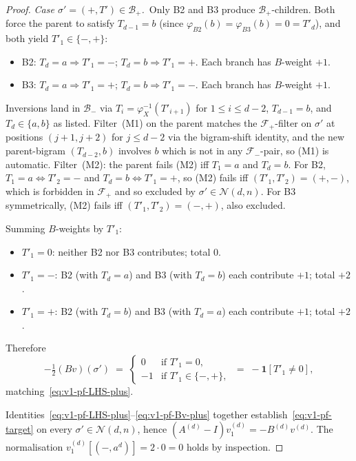 \documentclass{amsart}
\theoremstyle{definition}
\theoremstyle{remark}
\begin{document}
\begin{proof}
\emph{Case $\sigma' = (+, T') \in \mathcal{B}_+$.}\ Only B2 and
B3 produce $\mathcal{B}_+$-children.  Both force the parent to
satisfy $T_{d-1} = b$ (since $\varphi_{B2}(b) = \varphi_{B3}(b) =
0 = T'_d$), and both yield $T'_1 \in \{-, +\}$:
\begin{itemize}
\item B2: $T_d = a \Rightarrow T'_1 = -$; $T_d = b \Rightarrow
  T'_1 = +$.  Each branch has $B$-weight $+1$.
\item B3: $T_d = a \Rightarrow T'_1 = +$; $T_d = b \Rightarrow
  T'_1 = -$.  Each branch has $B$-weight $+1$.
\end{itemize}
Inversions land in $\mathcal{B}_-$ via $T_i = \varphi_X^{-1}
(T'_{i+1})$ for $1 \le i \le d-2$, $T_{d-1} = b$, and $T_d \in
\{a, b\}$ as listed.  Filter~(M1) on the parent matches the
$\mathcal{F}_+$-filter on $\sigma'$ at positions $(j+1, j+2)$ for
$j \le d-2$ via the bigram-shift identity, and the new
parent-bigram $(T_{d-2}, b)$ involves $b$ which is not in any
$\mathcal{F}_-$-pair, so (M1) is automatic.  Filter~(M2): the
parent fails (M2) iff $T_1 = a$ and $T_d = b$.  For B2,
$T_1 = a \Leftrightarrow T'_2 = -$ and $T_d = b \Leftrightarrow
T'_1 = +$, so (M2) fails iff $(T'_1, T'_2) = (+, -)$, which is
forbidden in $\mathcal{F}_+$ and so excluded by $\sigma' \in
\mathcal{N}(d, n)$.  For B3 symmetrically, (M2) fails iff
$(T'_1, T'_2) = (-, +)$, also excluded.

Summing $B$-weights by $T'_1$:
\begin{itemize}
\item $T'_1 = 0$: neither B2 nor B3 contributes; total $0$.
\item $T'_1 = -$: B2 (with $T_d = a$) and B3 (with $T_d = b$)
  each contribute $+1$; total $+2$.
\item $T'_1 = +$: B2 (with $T_d = b$) and B3 (with $T_d = a$)
  each contribute $+1$; total $+2$.
\end{itemize}
Therefore
\begin{equation}\label{eq:v1-pf-Bv-plus}
  -\tfrac{1}{2} (B v)(\sigma')
    \;=\;
    \begin{cases}
      0  & \text{if } T'_1 = 0, \\
      -1 & \text{if } T'_1 \in \{-, +\},
    \end{cases}
  \;=\; -\mathbf{1}[T'_1 \ne 0],
\end{equation}
matching~\eqref{eq:v1-pf-LHS-plus}.

\smallskip
Identities~\eqref{eq:v1-pf-LHS-plus}--\eqref{eq:v1-pf-Bv-plus}
together establish~\eqref{eq:v1-pf-target} on every
$\sigma' \in \mathcal{N}(d, n)$, hence
$(A^{(d)} - I) v^{(d)}_1 = -B^{(d)} v^{(d)}$.  The normalisation
$v^{(d)}_1[(-, a^d)] = 2 \cdot 0 = 0$ holds by inspection.
\end{proof}
\end{document}
